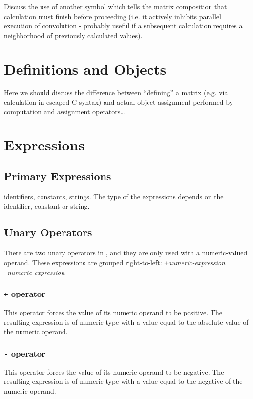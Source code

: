 Discuss the use of another symbol which tells the matrix composition that calculation must finish before proceeding (i.e. it actively inhibits parallel execution of convolution - probably useful if a subsequent calculation requires a neighborhood of previously calculated values).

\section{Definitions and Objects}
\label{sec:defobj}
Here we should discuss the difference between ``defining'' a matrix (e.g. via calculation in escaped-C syntax) and actual object assignment performed by computation and assignment operators\ldots

\section{Expressions}
\label{sec:expressions}

\subsection{Primary Expressions}
\label{ssec:primaryexpresions}
identifiers, constants, strings. The type of the expressions depends on the identifier, constant or string.

\subsection{Unary Operators}
\label{ssec:unaryoperators}
There are two unary operators in \sys{}, and they are only used with a
numeric-valued operand.
These expressions are grouped right-to-left:
\startsyn
\texttt{+}\emph{numeric-expression} \\
\texttt{-}\emph{numeric-expression}
\stopsyn

\subsubsection{\texttt{+} operator}
This operator forces the value of its numeric operand to be positive.
The resulting expression is of numeric type with a value equal to the
absolute value of the numeric operand.

\subsubsection{\texttt{-} operator}
This operator forces the value of its numeric operand to be negative.
The resulting expression is of numeric type with a value equal to the
negative of the numeric operand.

